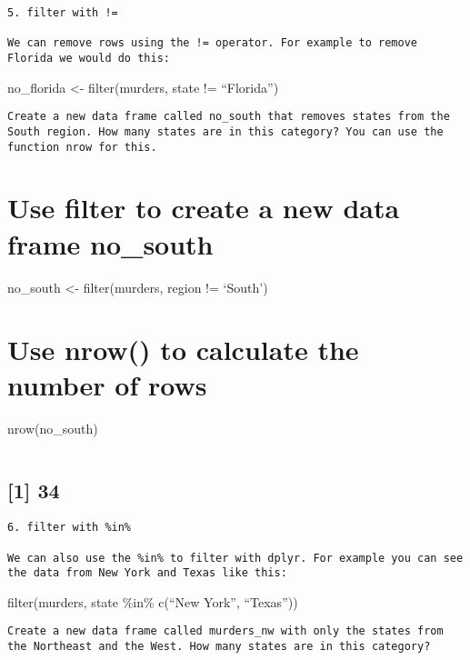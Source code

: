 \documentclass[
]{article}
\begin{document}
\begin{verbatim}
5. filter with !=

We can remove rows using the != operator. For example to remove Florida we would do this:
\end{verbatim}

no\_florida \textless- filter(murders, state != ``Florida'')

\begin{verbatim}
Create a new data frame called no_south that removes states from the South region. How many states are in this category? You can use the function nrow for this.
\end{verbatim}

\hypertarget{use-filter-to-create-a-new-data-frame-no_south}{%
\section{Use filter to create a new data frame
no\_south}\label{use-filter-to-create-a-new-data-frame-no_south}}

no\_south \textless- filter(murders, region != `South')

\hypertarget{use-nrow-to-calculate-the-number-of-rows}{%
\section{Use nrow() to calculate the number of
rows}\label{use-nrow-to-calculate-the-number-of-rows}}

nrow(no\_south)

\begin{verbatim}
\end{verbatim}

\hypertarget{section-1}{%
\subsection{{[}1{]} 34}\label{section-1}}

\begin{verbatim}
6. filter with %in%
    
We can also use the %in% to filter with dplyr. For example you can see the data from New York and Texas like this:
\end{verbatim}

filter(murders, state \%in\% c(``New York'', ``Texas''))

\begin{verbatim}
Create a new data frame called murders_nw with only the states from the Northeast and the West. How many states are in this category?
\end{verbatim}
\end{document}
